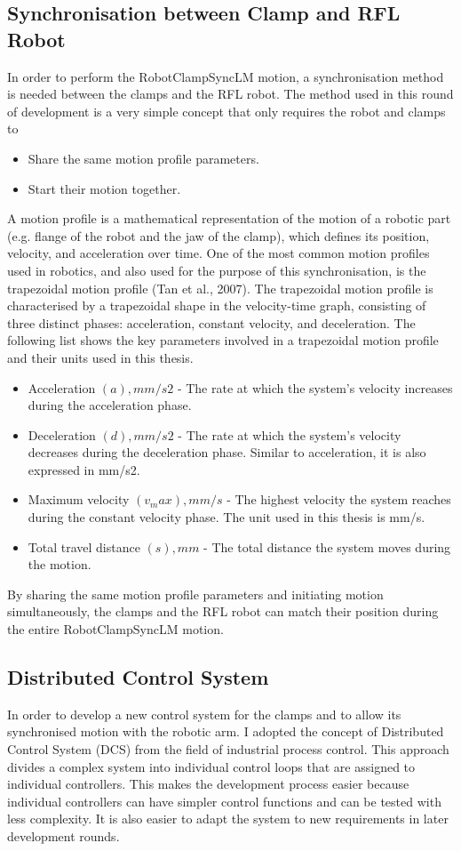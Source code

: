 \subsection{Synchronisation between Clamp and RFL Robot}
In order to perform the RobotClampSyncLM motion, a synchronisation method is needed between the clamps and the RFL robot. The method used in this round of development is a very simple concept that only requires the robot and clamps to
\begin{itemize}
    \item Share the same motion profile parameters.
    \item Start their motion together.
\end{itemize}
    A motion profile is a mathematical representation of the motion of a robotic part (e.g. flange of the robot and the jaw of the clamp), which defines its position, velocity, and acceleration over time. One of the most common motion profiles used in robotics, and also used for the purpose of this synchronisation, is the trapezoidal motion profile (Tan et al., 2007).
The trapezoidal motion profile is characterised by a trapezoidal shape in the velocity-time graph, consisting of three distinct phases: acceleration, constant velocity, and deceleration. The following list shows the key parameters involved in a trapezoidal motion profile and their units used in this thesis.
\begin{itemize}
    \item Acceleration $(a), mm/s2$ - The rate at which the system's velocity increases during the acceleration phase. 
    \item Deceleration $(d), mm/s2$ - The rate at which the system's velocity decreases during the deceleration phase. Similar to acceleration, it is also expressed in mm/s2. 
    \item Maximum velocity $(v_max), mm/s$ - The highest velocity the system reaches during the constant velocity phase. The unit used in this thesis is mm/s. 
    \item Total travel distance $(s), mm$ - The total distance the system moves during the motion. 
\end{itemize}

By sharing the same motion profile parameters and initiating motion simultaneously, the clamps and the RFL robot can match their position during the entire RobotClampSyncLM motion.

\subsection{Distributed Control System}
In order to develop a new control system for the clamps and to allow its synchronised motion with the robotic arm. I adopted the concept of Distributed Control System (DCS) from the field of industrial process control. This approach divides a complex system into individual control loops that are assigned to individual controllers. This makes the development process easier because individual controllers can have simpler control functions and can be tested with less complexity. It is also easier to adapt the system to new requirements in later development rounds. 


